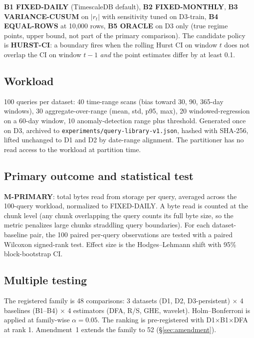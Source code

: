 \documentclass[11pt]{article}
\begin{document}
\textbf{B1 FIXED-DAILY} (TimescaleDB default), \textbf{B2 FIXED-MONTHLY}, \textbf{B3 VARIANCE-CUSUM} on $|r_t|$ with sensitivity tuned on D3-train, \textbf{B4 EQUAL-ROWS} at 10{,}000 rows, \textbf{B5 ORACLE} on D3 only (true regime points, upper bound, not part of the primary comparison). The candidate policy is \textbf{HURST-CI}: a boundary fires when the rolling Hurst CI on window $t$ does not overlap the CI on window $t-1$ \emph{and} the point estimates differ by at least 0.1.

\subsection{Workload}

100 queries per dataset: 40 time-range scans (bias toward 30, 90, 365-day windows), 30 aggregate-over-range (mean, std, p95, max), 20 windowed-regression on a 60-day window, 10 anomaly-detection range plus threshold. Generated once on D3, archived to \texttt{experiments/query-library-v1.json}, hashed with SHA-256, lifted unchanged to D1 and D2 by date-range alignment. The partitioner has no read access to the workload at partition time.

\subsection{Primary outcome and statistical test}

\textbf{M-PRIMARY}: total bytes read from storage per query, averaged across the 100-query workload, normalized to FIXED-DAILY. A byte read is counted at the chunk level (any chunk overlapping the query counts its full byte size, so the metric penalizes large chunks straddling query boundaries). For each dataset-baseline pair, the 100 paired per-query observations are tested with a paired Wilcoxon signed-rank test. Effect size is the Hodges--Lehmann shift with 95\% block-bootstrap CI.

\subsection{Multiple testing}

The registered family is 48 comparisons: 3 datasets (D1, D2, D3-persistent) $\times$ 4 baselines (B1--B4) $\times$ 4 estimators (DFA, R/S, GHE, wavelet). Holm--Bonferroni is applied at family-wise $\alpha=0.05$. The ranking is pre-registered with D1$\times$B1$\times$DFA at rank 1. Amendment~1 extends the family to 52 (\S\ref{sec:amendment}).
\end{document}
